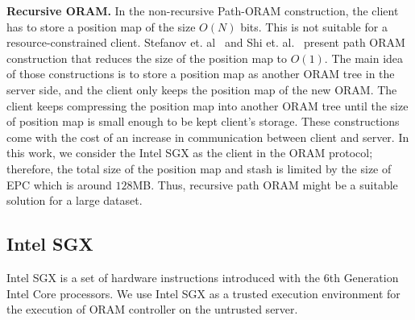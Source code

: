 \textbf{Recursive ORAM.} 
In the non-recursive Path-ORAM construction, the client has to store a position map of the size $O(N)$ bits. 
This is not suitable for a resource-constrained client. Stefanov et. al~\cite{Stefanov:2013} and Shi et. al.~\cite{Elaine-rORAM} present path ORAM construction that reduces the size of the position map to $O(1)$. 
The main idea of those constructions is to store a position map as another ORAM tree in the server side, and the client only keeps the position map of the new ORAM.
The client keeps compressing the position map into another ORAM tree until the size of position map is small enough to be kept client's storage. 
These constructions come with the cost of an increase in communication between client and server. 
In this work, we consider the Intel SGX as the client in the ORAM protocol; therefore, the total size of the position map and stash is limited by the size of EPC which is around $128$MB. Thus, recursive path ORAM might be a suitable solution for a large dataset. 

\subsection{Intel SGX} %
\label{sub:intel_sgx}
Intel SGX is a set of hardware instructions introduced with the 6th Generation Intel Core processors. 
We use Intel SGX as a trusted execution environment for the execution of ORAM controller on the untrusted server. 

